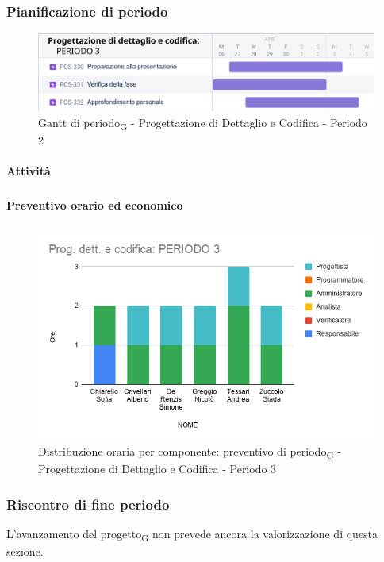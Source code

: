 \subsubsection{Pianificazione di periodo}


\begin{figure}[H]
	\centering
	\includegraphics[scale=0.60]{res/images/gantt_periodo/progdett_3_gantt.png}
	\caption{Gantt di periodo\textsubscript{G} - Progettazione di Dettaglio e Codifica - Periodo 2}
\end{figure}

\paragraph{Attività}
\subparagraph*{}

\planningTable{
	
}



\paragraph{Preventivo orario ed economico}
\subparagraph*{}

\contabilitaTable{
	
}

\begin{figure}[H]
	\centering
	\includegraphics[scale=0.6]{res/images/charts/preventivo/prog_dett_3.png}
	\caption{Distribuzione oraria per componente: preventivo di periodo\textsubscript{G} - Progettazione di Dettaglio e Codifica - Periodo 3}
\end{figure}



\subsubsection{Riscontro di fine periodo}


L'avanzamento del progetto\textsubscript{G} non prevede ancora la valorizzazione di questa sezione.
